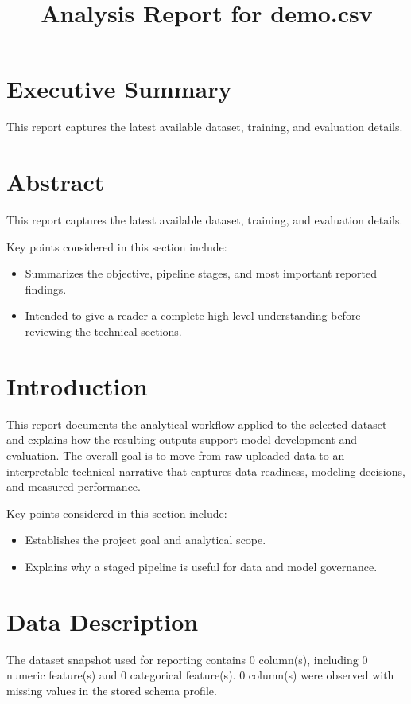\documentclass[11pt]{article}
\title{Analysis Report for demo.csv}
\date{}
\begin{document}
\maketitle


\section{Executive Summary}
This report captures the latest available dataset, training, and evaluation details.

\section{Abstract}
This report captures the latest available dataset, training, and evaluation details.

Key points considered in this section include:

\begin{itemize}
\item Summarizes the objective, pipeline stages, and most important reported findings.
\item Intended to give a reader a complete high-level understanding before reviewing the technical sections.
\end{itemize}


\section{Introduction}
This report documents the analytical workflow applied to the selected dataset and explains how the resulting outputs support model development and evaluation. The overall goal is to move from raw uploaded data to an interpretable technical narrative that captures data readiness, modeling decisions, and measured performance.

Key points considered in this section include:

\begin{itemize}
\item Establishes the project goal and analytical scope.
\item Explains why a staged pipeline is useful for data and model governance.
\end{itemize}


\section{Data Description}
The dataset snapshot used for reporting contains 0 column(s), including 0 numeric feature(s) and 0 categorical feature(s). 0 column(s) were observed with missing values in the stored schema profile.
\end{document}
